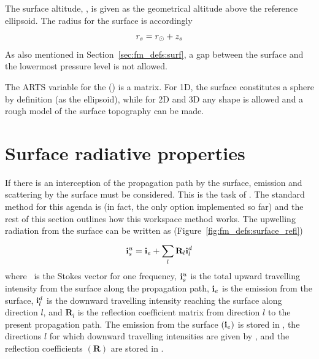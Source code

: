 The surface altitude, , is given as the geometrical altitude above the
reference ellipsoid. The radius for the surface is accordingly
\begin{equation}
  r_{s} = r_{\odot} + z_{s}
 \label{eq:fm_defs:zsurface}
\end{equation}
As also mentioned in Section~\ref{sec:fm_defs:surf}, a gap between the surface
and the lowermost pressure level is not allowed.

The ARTS variable for the  ()
is a matrix. For 1D, the surface constitutes a sphere by definition (as the
ellipsoid), while for 2D and 3D any shape is allowed and a rough model of the
surface topography can be made.



\section{Surface radiative properties}
\label{sec:fm_defs:surface}

If there is an interception of the propagation path by the surface, emission
and scattering by the surface must be considered. This is the task of
. The standard method for this agenda is
 (in fact, the only option implemented so far)
and the rest of this section outlines how this workspace method works. The
upwelling radiation from the surface can be written as
(Figure~\ref{fig:fm_defs:surface_refl})
\begin{equation}
  \mathbf{i}_s^u = \mathbf{i}_e + \sum_l^{} \mathbf{R}_l \mathbf{i}_l^d
  \label{eq:fm_defs:surfacerefl}
\end{equation}
where \MpiVct\ is the Stokes vector for one frequency, $\mathbf{i}_s^u$
is the total upward travelling intensity from the surface along the
propagation path, $\mathbf{i}_e$ is the emission from the surface,
$\mathbf{i}_l^d$ is the downward travelling intensity reaching the
surface along direction $l$, and $\mathbf{R}_l$ is the reflection
coefficient matrix from direction $l$ to the present propagation path.
The emission from the surface $(\mathbf{i}_e)$ is stored in
, the directions $l$ for which downward
travelling intensities are given by , and the
reflection coefficients $(\mathbf{R})$ are stored in
. 

